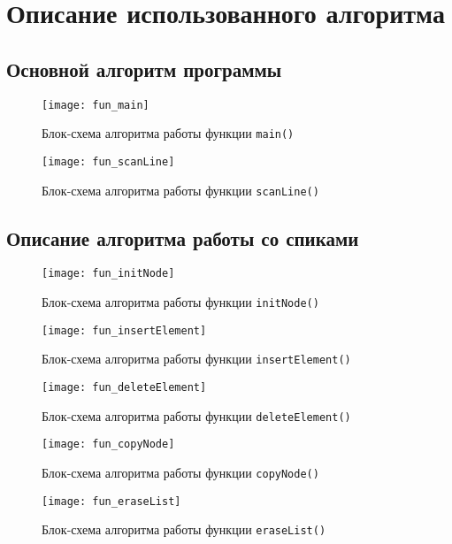 \section{Описание использованного алгоритма}

\subsection{Основной алгоритм программы}
\begin{figure}[H]
  \centering
  \texttt{[image: fun\_main]}
  \caption{Блок-схема алгоритма работы функции \texttt{main()}}
\end{figure}

\begin{figure}[H]
  \centering
  \texttt{[image: fun\_scanLine]}
  \caption{Блок-схема алгоритма работы функции \texttt{scanLine()}}
\end{figure}

\subsection{Описание алгоритма работы со спиками}
\begin{figure}[H]
  \centering
  \texttt{[image: fun\_initNode]}
  \caption{Блок-схема алгоритма работы функции \texttt{initNode()}}
\end{figure}

\begin{figure}[H]
  \centering
  \texttt{[image: fun\_insertElement]}
  \caption{Блок-схема алгоритма работы функции \texttt{insertElement()}}
\end{figure}

\begin{figure}[H]
  \centering
  \texttt{[image: fun\_deleteElement]}
  \caption{Блок-схема алгоритма работы функции \texttt{deleteElement()}}
\end{figure}

\begin{figure}[H]
  \centering
  \texttt{[image: fun\_copyNode]}
  \caption{Блок-схема алгоритма работы функции \texttt{copyNode()}}
\end{figure}

\begin{figure}[H]
  \centering
  \texttt{[image: fun\_eraseList]}
  \caption{Блок-схема алгоритма работы функции \texttt{eraseList()}}
\end{figure}

